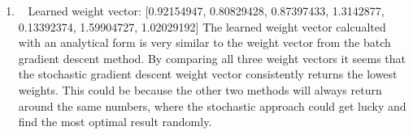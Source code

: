 \documentclass[12pt, fullpage,letterpaper]{article}
\begin{document}
\begin{enumerate}
\begin{enumerate}
		\item~
		\newline Learned weight vector: [0.92154947, 0.80829428, 0.87397433, 1.3142877,  0.13392374, 1.59904727, 1.02029192]
		\newline The learned weight vector calcualted with an analytical form is very similar to the weight vector from the batch gradient descent method. By comparing all three weight vectors it seems that the stochastic gradient descent weight vector consistently returns the lowest weights. 
		This could be because the other two methods will always return around the same numbers, where the stochastic approach could get lucky and find the most optimal result randomly. 
	\end{enumerate}

\end{enumerate}
\end{document}
